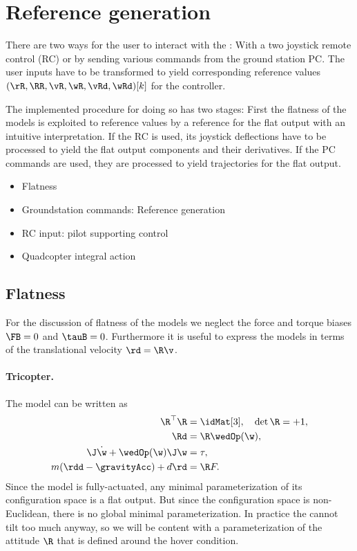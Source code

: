 \section{Reference generation}
There are two ways for the user to interact with the \Multicopters: With a two joystick remote control (RC) or by sending various commands from the ground station PC.
The user inputs have to be transformed to yield corresponding reference values $(\rR, \RR, \vR, \wR, \vRd, \wRd)[k]$ for the \Multicopter controller.

The implemented procedure for doing so has two stages:
First the flatness of the \Multicopter models is exploited to reference values by a reference for the flat output with an intuitive interpretation.
If the RC is used, its joystick deflections have to be processed to yield the flat output components and their derivatives.
If the PC commands are used, they are processed to yield trajectories for the flat output.

\begin{itemize}
 \item Flatness
 \item Groundstation commands: Reference generation
 \item RC input: pilot supporting control
 \item Quadcopter integral action
\end{itemize}


\subsection{Flatness}\label{sec:RealizationRefGenFlatness}
For the discussion of flatness of the \Multicopter models we neglect the force and torque biases $\FB=0$ and $\tauB=0$.
Furthermore it is useful to express the models in terms of the translational velocity $\rd = \R \v$.

\paragraph{Tricopter.}
The \Tricopter model can be written as
\begin{subequations}\label{eq:RefGenTricopterModel}
\begin{align}
 \R^\top \R &= \idMat[3], \quad \det \R = +1,
\label{eq:RefGenTricopterGeoConstraint}
\\
 \Rd &= \R \wedOp(\w),
\\
 \J \dot{\w} + \wedOp(\w) \J \w &= \tau,
\\
 m(\rdd-\gravityAcc) + d \rd &= \R F.
\label{eq:RefGenTricopterTranslationalDyn}
\end{align}
\end{subequations}
Since the model is fully-actuated, any minimal parameterization of its configuration space is a flat output.
But since the configuration space is non-Euclidean, there is no global minimal parameterization.
In practice the \Tricopter cannot tilt too much anyway, so we will be content with a parameterization of the attitude $\R$ that is defined around the hover condition.

